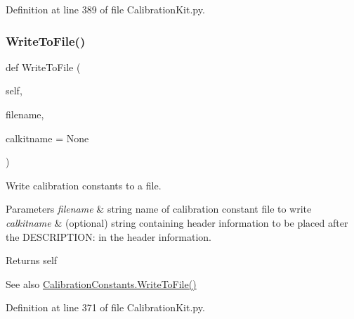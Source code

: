 Definition at line 389 of file Calibration\+Kit.\+py.

\mbox{\label{classSignalIntegrity_1_1Measurement_1_1CalKit_1_1CalibrationKit_1_1CalibrationKit_ac68713cc133371d7a733dd318b5669d3}} 
\subsubsection{\texorpdfstring{Write\+To\+File()}{WriteToFile()}}
{\footnotesize\ttfamily def Write\+To\+File (\begin{DoxyParamCaption}\item[{}]{self,  }\item[{}]{filename,  }\item[{}]{calkitname = {\ttfamily None} }\end{DoxyParamCaption})}



Write calibration constants to a file. 


\begin{DoxyParams}{Parameters}
{\em filename} & string name of calibration constant file to write \\
\hline
{\em calkitname} & (optional) string containing header information to be placed after the D\+E\+S\+C\+R\+I\+P\+T\+I\+ON\+: in the header information. \\
\hline
\end{DoxyParams}
\begin{DoxyReturn}{Returns}
self 
\end{DoxyReturn}
\begin{DoxySeeAlso}{See also}
\hyperlink{classSignalIntegrity_1_1Measurement_1_1CalKit_1_1CalibrationKit_1_1CalibrationConstants_ac68713cc133371d7a733dd318b5669d3}{Calibration\+Constants.\+Write\+To\+File()} 
\end{DoxySeeAlso}


Definition at line 371 of file Calibration\+Kit.\+py.



